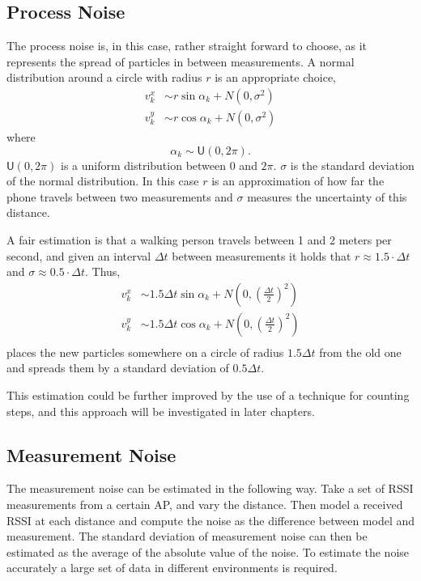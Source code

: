 \documentclass{LTHthesis}
\begin{document}
\subsection{Process Noise}  
%
The process noise is, in this case, rather straight forward to choose, as it represents the spread of particles in between measurements. A normal distribution around a circle with radius $r$ is an appropriate choice,
%
\begin{eqnarray}
v^x_k &\sim r\sin{\alpha_k}+N(0,\sigma^2)\\
v^y_k &\sim r\cos{\alpha_k}+N(0,\sigma^2)
\end{eqnarray}
%
where
%
\begin{equation}
\alpha_k \sim \mathsf U(0,2\pi).
\end{equation}
%
$\mathsf{U}(0,2\pi)$ is a uniform distribution between $0$ and $2\pi$. $\sigma$ is the standard deviation of the normal distribution. In this case $r$ is an approximation of how far the phone travels between two measurements and $\sigma$ measures the uncertainty of this distance. 

A fair estimation is that a walking person travels between 1 and 2 meters per second, and given an interval $\Delta t$ between measurements it holds that $r \approx 1.5\cdot\Delta t$ and $\sigma \approx 0.5\cdot\Delta t$. Thus,
%
\begin{eqnarray}
v^x_k&\sim 1.5\Delta t \sin{\alpha_k} + N \left(0, \left(\frac{\Delta t}{2}\right)^2\right)\\
v^y_k&\sim 1.5\Delta t \cos{\alpha_k} + N \left(0, \left(\frac{\Delta t}{2}\right)^2\right)\\
\end{eqnarray}
places the new particles somewhere on a circle of radius $1.5\Delta t$ from the old one and spreads them by a standard deviation of $0.5\Delta t$.

This estimation could be further improved by the use of a technique for counting steps, and this approach will be investigated in later chapters.    
%
\subsection{Measurement Noise}
%
The measurement noise can be estimated in the following way. Take a set of RSSI measurements from a certain AP, and vary the distance. Then model a received RSSI at each distance and compute the noise as the difference between model and measurement. The standard deviation of measurement noise can then be estimated as the average of the absolute value of the noise. To estimate the noise accurately a large set of data in different environments is required.
\end{document}
